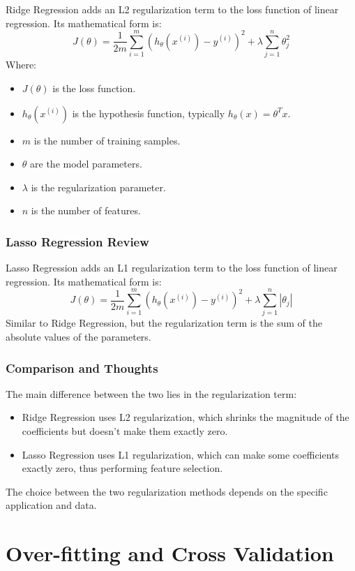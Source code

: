 \documentclass{article}
\begin{document}
Ridge Regression adds an L2 regularization term to the loss function of linear regression. Its mathematical form is:
\[
J(\theta) = \frac{1}{2m} \sum_{i=1}^{m} (h_{\theta}(x^{(i)}) - y^{(i)})^2 + \lambda \sum_{j=1}^{n} \theta_j^2
\]
Where:
\begin{itemize}
    \item \( J(\theta) \) is the loss function.
    \item \( h_{\theta}(x^{(i)}) \) is the hypothesis function, typically \( h_{\theta}(x) = \theta^T x \).
    \item \( m \) is the number of training samples.
    \item \( \theta \) are the model parameters.
    \item \( \lambda \) is the regularization parameter.
    \item \( n \) is the number of features.
\end{itemize}

\subsubsection{Lasso Regression Review}

Lasso Regression adds an L1 regularization term to the loss function of linear regression. Its mathematical form is:
\[
J(\theta) = \frac{1}{2m} \sum_{i=1}^{m} (h_{\theta}(x^{(i)}) - y^{(i)})^2 + \lambda \sum_{j=1}^{n} |\theta_j|
\]
Similar to Ridge Regression, but the regularization term is the sum of the absolute values of the parameters.

\subsubsection{Comparison and Thoughts}

The main difference between the two lies in the regularization term:
\begin{itemize}
    \item Ridge Regression uses L2 regularization, which shrinks the magnitude of the coefficients but doesn't make them exactly zero.
    \item Lasso Regression uses L1 regularization, which can make some coefficients exactly zero, thus performing feature selection.
\end{itemize}
The choice between the two regularization methods depends on the specific application and data.
\newpage

\section{Over-fitting and Cross Validation}
\end{document}
